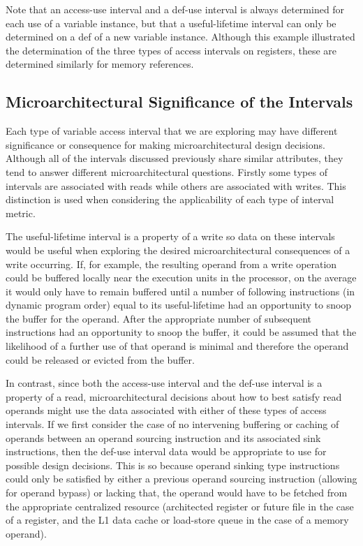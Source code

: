 \documentclass[10pt,dvips]{article}
\begin{document}
Note that an access-use interval and a def-use interval is always 
determined for each
use of a variable instance, but that a useful-lifetime interval can
only be determined on a def of a new variable instance.
Although this example illustrated the determination of
the three types of access intervals on registers, these are
determined similarly for memory references.
%
\subsection{Microarchitectural Significance of the Intervals}
%
Each type of variable access interval that we are exploring
may have different significance or consequence 
for making microarchitectural design decisions.
Although all of the intervals discussed previously share
similar attributes, they tend to answer different microarchitectural
questions.
Firstly some types of intervals are associated with reads
while others are associated with writes.
This distinction is used when considering the applicability of each
type of interval metric.

The useful-lifetime interval is a property of a write
so data on these intervals would be useful when exploring
the desired microarchitectural consequences of a write occurring.
If, for example, the resulting operand from a write operation
could be buffered locally near the execution units in the processor,
on the average it would only have to remain buffered until
a number of following instructions (in dynamic program order)
equal to its
useful-lifetime had an opportunity to snoop the buffer for the
operand.
After the appropriate number of subsequent instructions had an 
opportunity to snoop the buffer, it could be assumed that
the likelihood of a further use of that operand is minimal
and therefore the operand could be released or evicted from the
buffer.

In contrast, since both the access-use interval and the def-use
interval is a property of a read, microarchitectural decisions
about how to best satisfy read operands might use the data associated
with either of these types of access intervals.
If we first consider the case of no intervening buffering or caching
of operands between an operand sourcing instruction and its
associated sink instructions, then the def-use interval data would
be appropriate to use for possible design decisions.
This is so because operand sinking type instructions could only
be satisfied by either a previous operand sourcing instruction
(allowing for operand bypass) or lacking that, the operand would have to be
fetched from the appropriate centralized resource (architected
register or future file in the case of a register, and the L1 data
cache or load-store queue in the case of a memory operand).
\end{document}
